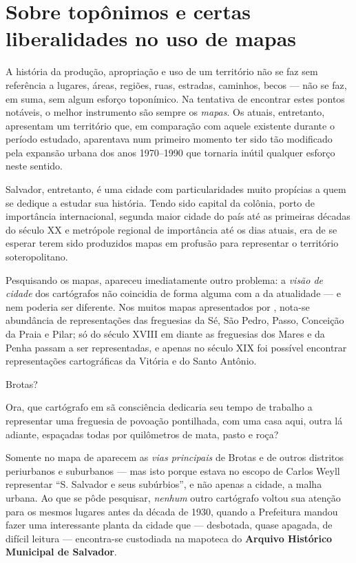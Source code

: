 \chapter{Sobre topônimos e certas liberalidades no uso de mapas}
\label{ap:mapas}

A história da produção, apropriação e uso de um território não se faz sem referência a lugares, áreas, regiões, ruas, estradas, caminhos, becos --- não se faz, em suma, sem algum esforço toponímico. Na tentativa de encontrar estes pontos notáveis, o melhor instrumento são sempre os \textit{mapas}. Os atuais, entretanto, apresentam um território que, em comparação com aquele existente durante o período estudado, aparentava num primeiro momento ter sido tão modificado pela expansão urbana dos anos 1970--1990 que tornaria inútil qualquer esforço neste sentido.

Salvador, entretanto, é uma cidade com particularidades muito propícias a quem se dedique a estudar sua história. Tendo sido capital da colônia, porto de importância internacional, segunda maior cidade do país até as primeiras décadas do século XX e metrópole regional de importância até os dias atuais, era de se esperar terem sido produzidos mapas em profusão para representar o território soteropolitano.

Pesquisando os mapas, apareceu imediatamente outro problema: a \textit{visão de cidade} dos cartógrafos não coincidia de forma alguma com a da atualidade --- e nem poderia ser diferente. Nos muitos mapas apresentados por , nota-se abundância de representações das freguesias da Sé, São Pedro, Passo, Conceição da Praia e Pilar; só do século XVIII em diante as freguesias dos Mares e da Penha passam a ser representadas, e apenas no século XIX foi possível encontrar representações cartográficas da Vitória e do Santo Antônio.

Brotas?

Ora, que cartógrafo em sã consciência dedicaria seu tempo de trabalho a representar uma freguesia de povoação pontilhada, com uma casa aqui, outra lá adiante, espaçadas todas por quilômetros de mata, pasto e roça?

Somente no mapa de  aparecem as \textit{vias principais} de Brotas e de outros distritos periurbanos e suburbanos --- mas isto porque estava no escopo de Carlos Weyll representar ``S. Salvador e seus subúrbios'', e não apenas a cidade, a malha urbana. Ao que se pôde pesquisar, \textit{nenhum} outro cartógrafo voltou sua atenção para os mesmos lugares antes da década de 1930, quando a Prefeitura mandou fazer uma interessante planta da cidade que --- desbotada, quase apagada, de difícil leitura --- encontra-se custodiada na mapoteca do \textbf{Arquivo Histórico Municipal de Salvador}.

